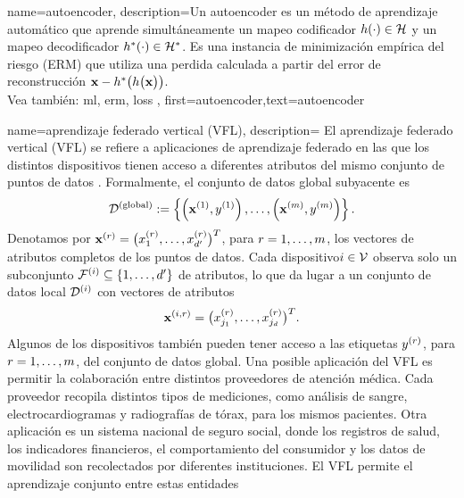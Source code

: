 {name={autoencoder},
	description={Un autoencoder es un método de aprendizaje automático que aprende simultáneamente un mapeo codificador
		$h(\cdot) \in \mathcal{H}$ y un mapeo decodificador $h^{*}(\cdot) \in \mathcal{H}^{*}$. 
		Es una instancia de minimización empírica del riesgo (ERM) que utiliza una perdida calculada a partir del error de reconstrucción 
		${\bf x} - h^{*}\big(  h \big( {\bf x} \big) \big)$.
		\\
		Vea también: \gls{ml}, \gls{erm}, \gls{loss} },
	first={autoencoder},text={autoencoder}
} 

{name={aprendizaje federado vertical (VFL)},
	description={
		El aprendizaje federado vertical (VFL) se refiere a aplicaciones de aprendizaje federado en las que  
		los distintos dispositivos tienen acceso a diferentes atributos del mismo conjunto de puntos de datos \cite{VFLChapter}. 
		Formalmente, el conjunto de datos global subyacente es
		\[
		\mathcal{D}^{(\mathrm{global})} := \left\{ \left({\bf x}^{(1)}, y^{(1)}\right), \ldots, \left({\bf x}^{(m)}, y^{(m)}\right) \right\}.
		\]
		Denotamos por ${\bf x}^{(r)} = \big( x^{(r)}_{1}, \ldots, x^{(r)}_{d'} \big)^{T}$, para $r=1,\ldots,m$, 
	    los vectores de atributos completos de los puntos de datos. Cada dispositivo$i \in \mathcal{V}$ 
		observa solo un subconjunto $\mathcal{F}^{(i)} \subseteq \{1,\ldots,d'\}$ de atributos, lo que da lugar 
		a un conjunto de datos local $\mathcal{D}^{(i)}$ con vectores de atributos
		\[
		{\bf x}^{(i,r)} = \big( x^{(r)}_{j_{1}}, \ldots, x^{(r)}_{j_{d}} \big)^{T}.
		\]
		Algunos de los dispositivos también pueden tener acceso a las etiquetas $y^{(r)}$, para $r=1,\ldots,m$, 
		del conjunto de datos global. Una posible aplicación del VFL es permitir la colaboración entre distintos proveedores de atención médica. 
		Cada proveedor recopila distintos tipos de mediciones, como análisis de sangre, electrocardiogramas y radiografías de tórax, para los mismos pacientes. 
		Otra aplicación es un sistema nacional de seguro social, donde los registros de salud, los indicadores financieros, el comportamiento del consumidor 
		y los datos de movilidad son recolectados por diferentes instituciones. El VFL permite el aprendizaje conjunto entre estas entidades 
}}
